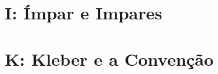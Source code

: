 \documentclass[12pt,oneside]{article} %
\begin{document}
%
%

\newpage
\section*{I: Ímpar e Impares} %



%
%

\newpage
\section*{K: Kleber e a Convenção} %



%
%
\end{document}
